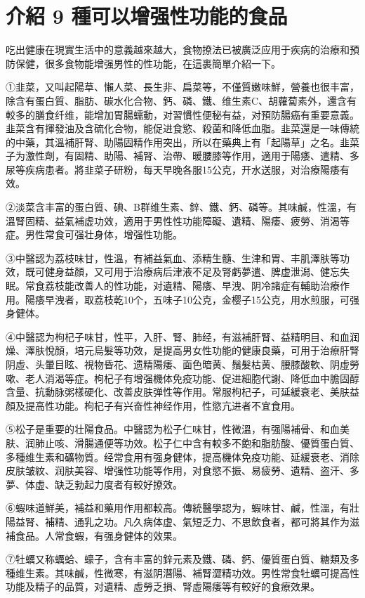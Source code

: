 \documentclass[12pt,UTF8]{ctexbook}
\begin{document}
\section{介紹 9 種可以增强性功能的食品}

吃出健康在現實生活中的意義越來越大，食物撩法已被廣泛应用于疾病的治療和預防保健，很多食物能增强男性的性功能，在這裹簡單介紹一下。

①韭菜，又叫起陽草、懶人菜、長生非、扁菜等，不僅質嫩味鮮，營養也很丰富，除含有蛋白質、脂肪、碳水化合物、鈣、磷、鐵、维生素C、胡蘿蔔素外，還含有較多的膳食纤维，能增加胃腸蠕動，对習慣性便秘有益，对預防腸癌有重要意義。韭菜含有揮發油及含硫化合物，能促进食慾、殺菌和降低血脂。韭菜還是一味傳統的中藥，其溫補肝腎、助陽固精作用突出，所以在藥典上有「起陽草」之名。韭菜子为激性劑，有固精、助陽、補腎、治帶、暖腰膝等作用，適用于陽痿、遣精、多尿等疾病患者。將韭菜子研粉，每天早晚各服15公克，开水送服，对治療陽痿有效。

②淡菜含丰富的蛋白質、碘、B群维生素、鋅、鐵、鈣、磷等。其味鹹，性溫，有溫腎固精、益氣補虚功效，適用于男性性功能障礙、遺精、陽痿、疲勞、消渴等症。男性常食可强壮身体，增强性功能。

③中醫認为荔枝味甘，性溫，有補益氣血、添精生髓、生津和胃、丰肌澤肤等功效，既可健身益顏，又可用于治療病后津液不足及腎虧夢遣、脾虚泄潟、健忘失眠。常食荔枝能改善人的性功能，对遺精、陽痿、早洩、阴冷諸症有輔助治療作用。陽痿早洩者，取荔枝乾10个，五味子10公克，金樱子15公克，用水煎服，可强身健体。

④中醫認为枸杞子味甘，性平，入肝、腎、肺经，有滋補肝腎、益精明目、和血润燥、澤肤悅顏，培元烏髮等功效，是提高男女性功能的健康良藥，可用于治療肝腎阴虛、头暈目眩、視物昏花、遗精陽痿、面色暗黄、鬚髮枯黄、腰膝酸軟、阴虛勞嗽、老人消渴等症。枸杞子有增强機体免疫功能、促进細胞代謝、降低血中膽固醇含量、抗動脉粥樣硬化、改善皮肤弹性等作用。常服枸杞子，可延緩衰老、美肤益顏及提高性功能。枸杞子有兴奋性神经作用，性慾亢进者不宜食用。

⑤松子是重要的壮陽食品。中醫認为松子仁味甘，性微溫，有强陽補骨、和血美肤、润肺止咳、滑腸通便等功效。松子仁中含有較多不飽和脂肪酸、優質蛋白質、多種维生素和礦物質。经常食用有强身健体，提高機体免疫功能、延緩衰老、消除皮肤皱紋、润肤美容、增强性功能等作用，对食慾不振、易疲勞、遺精、盗汗、多夢、体虚、缺乏勃起力度者有較好撩效。

⑥蝦味道鮮美，補益和藥用作用都較高。傳統醫學認为，蝦味甘、鹹，性溫，有壯陽益腎、補精、通乳之功。凡久病体虚、氣短乏力、不思飲食者，都可將其作为滋補食品。人常食蝦，有强身健体的效果。

⑦牡蠣又称蠣蛤、蠔子，含有丰富的鋅元素及鐵、磷、鈣、優質蛋白質、糖類及多種维生素。其味鹹，性微寒，有滋阴潛陽、補腎澀精功效。男性常食牡蠣可提高性功能及精子的品質，对遺精、虛勞乏損、腎虛陽痿等有較好的食療效果。
\end{document}
